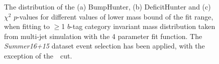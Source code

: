 \begin{figure}[!htb]
  \begin{center}
    \captionsetup[subfigure]{aboveskip=0pt,justification=centering}
  \end{center}
  \caption{The distribution of the (a) BumpHunter, (b) DeficitHunter and (c) $\chi^{2}$ $p$-values
    for different values of lower mass bound of the fit range, when fitting to $\geq$1 $b$-tag category
    invariant mass distribution taken from multi-jet simulation with the 4 parameter fit function.
    The \textit{Summer16+15} dataset event selection has been applied, with the exception of the~\mjj~cut.}
  \label{fig:mjjGraphs_bj_inc}
\end{figure}

